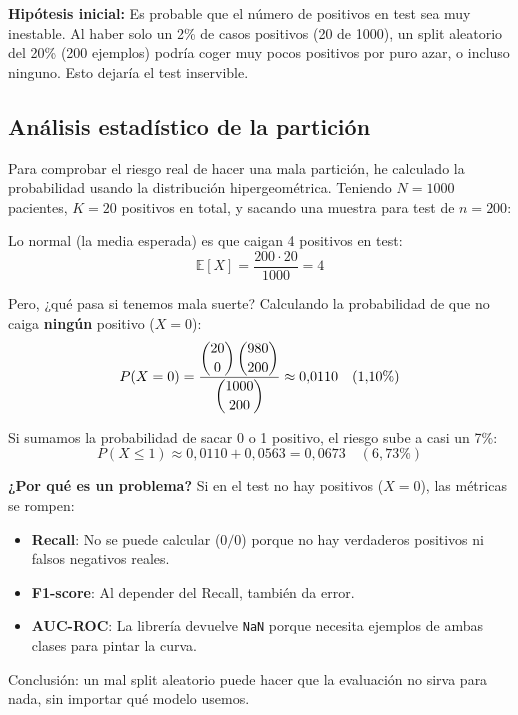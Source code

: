 \documentclass[../../__memoria.tex]{subfiles}
\begin{document}
\vspace{0.3cm}
\noindent\textbf{Hipótesis inicial:}
Es probable que el número de positivos en test sea muy inestable. Al haber solo un 2\% de casos positivos (20 de 1000), un split aleatorio del 20\% (200 ejemplos) podría coger muy pocos positivos por puro azar, o incluso ninguno. Esto dejaría el test inservible.
\vspace{0.3cm}

\subsection{Análisis estadístico de la partición}

Para comprobar el riesgo real de hacer una mala partición, he calculado la probabilidad usando la distribución hipergeométrica. Teniendo $N = 1000$ pacientes, $K = 20$ positivos en total, y sacando una muestra para test de $n = 200$:

Lo normal (la media esperada) es que caigan 4 positivos en test:
$$
  \mathbb{E}[X] = \frac{200 \cdot 20}{1000} = 4
$$

Pero, ¿qué pasa si tenemos mala suerte? Calculando la probabilidad de que no caiga \textbf{ningún} positivo ($X=0$):
$$
  P(X=0) = \frac{\dbinom{20}{0}\,\dbinom{980}{200}}{\dbinom{1000}{200}} \approx 0{,}0110 \quad (1{,}10\%)
$$

Si sumamos la probabilidad de sacar 0 o 1 positivo, el riesgo sube a casi un 7\%:
$$
  P(X \leq 1) \approx 0{,}0110 + 0{,}0563 = 0{,}0673 \quad (6{,}73\%)
$$

\noindent\textbf{¿Por qué es un problema?}
Si en el test no hay positivos ($X = 0$), las métricas se rompen:
\begin{itemize}
  \item \textbf{Recall}: No se puede calcular ($0/0$) porque no hay verdaderos positivos ni falsos negativos reales.
  \item \textbf{F1-score}: Al depender del Recall, también da error.
  \item \textbf{AUC-ROC}: La librería devuelve \texttt{NaN} porque necesita ejemplos de ambas clases para pintar la curva.
\end{itemize}
Conclusión: un mal split aleatorio puede hacer que la evaluación no sirva para nada, sin importar qué modelo usemos.

\end{document}
